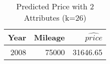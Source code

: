 \begin{table}[ht]
\centering
\begin{tabular}{rrr}
  \hline
Year & Mileage & $\widehat{price}$ \\ 
  \hline
2008 & 75000 & 31646.65 \\ 
   \hline
\end{tabular}
\caption{Predicted Price with 2 Attributes (k=26)} 
\label{tab:2p_predict}
\end{table}
